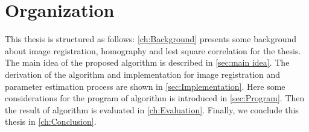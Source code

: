 \section{Organization}
This thesis is structured as follows: \cref{ch:Background} presents some background about image registration, homography and lest square correlation for the thesis. The main idea of the proposed algorithm is described in \cref{sec:main idea}. The derivation of the algorithm and implementation for image registration and parameter estimation process are shown in \cref{sec:Implementation}. Here some considerations for the program of algorithm is introduced in \cref{sec:Program}. Then the result of algorithm is evaluated in \cref{ch:Evaluation}. Finally, we conclude this thesis in \cref{ch:Conclusion}.

